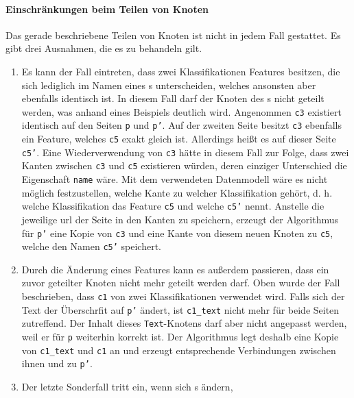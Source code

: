     \paragraph{Einschränkungen beim Teilen von Knoten}
    Das gerade beschriebene Teilen von Knoten ist nicht in jedem Fall gestattet.
    Es gibt drei Ausnahmen, die es zu behandeln gilt.

    \begin{enumerate}
        \item Es kann der Fall eintreten, dass zwei Klassifikationen Features besitzen,
        die sich lediglich im Namen eines {\childFeature}s unterscheiden,
        welches ansonsten aber ebenfalls identisch ist.
        In diesem Fall darf der Knoten des {\parentFeature}s nicht geteilt werden,
        was anhand eines Beispiels deutlich wird.
        Angenommen \texttt{c3} existiert identisch auf den Seiten \texttt{p} und \texttt{p'}.
        Auf der zweiten Seite besitzt \texttt{c3} ebenfalls ein Feature,
        welches \texttt{c5} exakt gleich ist.
        Allerdings heißt es auf dieser Seite \texttt{c5'}.
        Eine Wiederverwendung von \texttt{c3} hätte in diesem Fall zur Folge,
        dass zwei Kanten zwischen \texttt{c3} und \texttt{c5} existieren würden,
        deren einziger Unterschied die Eigenschaft \texttt{name} wäre.
        Mit dem verwendeten Datenmodell wäre es nicht möglich festzustellen,
        welche Kante zu welcher Klassifikation gehört,
        d. h. welche Klassifikation das Feature \texttt{c5} und welche \texttt{c5'} nennt.
        Anstelle die jeweilige \gls{url} der Seite in den Kanten zu speichern,
        erzeugt der Algorithmus für \texttt{p'} eine Kopie von \texttt{c3}
        und eine Kante von diesem neuen Knoten zu \texttt{c5},
        welche den Namen \texttt{c5'} speichert.
        \item Durch die Änderung eines Features kann es außerdem passieren,
        dass ein zuvor geteilter Knoten nicht mehr geteilt werden darf.
        Oben wurde der Fall beschrieben, dass \texttt{c1}
        von zwei Klassifikationen verwendet wird.
        Falls sich der Text der Überschrfit auf \texttt{p'} ändert,
        ist \texttt{c1\_text} nicht mehr für beide Seiten zutreffend.
        Der Inhalt dieses \texttt{Text}-Knotens darf aber nicht angepasst werden,
        weil er für \texttt{p} weiterhin korrekt ist.
        Der Algorithmus legt deshalb eine Kopie von \texttt{c1\_text} und \texttt{c1} an
        und erzeugt entsprechende Verbindungen zwischen ihnen und zu \texttt{p'}.
        \item Der letzte Sonderfall tritt ein, wenn sich {\childFeature}s ändern,

\end{enumerate}
